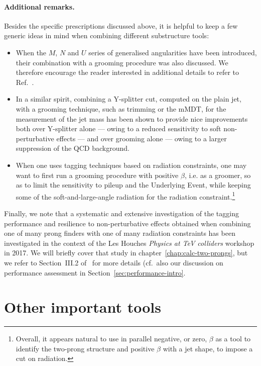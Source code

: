 \paragraph{Additional remarks.} 
%
Besides the specific prescriptions discussed above, it is helpful to
keep a few generic ideas in mind when combining different substructure
tools:
\begin{itemize}
\item When the $M$, $N$ and $U$ series of generalised angularities
  have been introduced, their combination with a grooming procedure
  was also discussed. We therefore encourage the reader interested in
  additional details to refer to Ref.~\cite{Moult:2016cvt}.
\item In a similar spirit, combining a Y-splitter cut, computed on the
  plain jet, with a grooming technique, such as trimming or the mMDT,
  for the measurement of the jet mass has been shown
  \cite{Dasgupta:2015yua,Dasgupta:2016ktv} to provide nice
  improvements both over Y-splitter alone --- owing to a reduced
  sensitivity to soft non-perturbative effects --- and over grooming
  alone --- owing to a larger suppression of the QCD background.
%
\item When one uses tagging techniques based on radiation constraints,
  one may want to first run a \SD grooming procedure with positive
  $\beta$, i.e. as a groomer, so as to limit the sensitivity to pileup
  and the Underlying Event, while keeping some of the
  soft-and-large-angle radiation for the radiation
  constraint.\footnote{Overall, it appears natural to use in parallel
    negative, or zero, $\beta$ as a tool to identify the two-prong
    structure and positive $\beta$ with a jet shape, to impose a cut
    on radiation.}
\end{itemize}

Finally, we note that a systematic and extensive investigation of the
tagging performance and resilience to non-perturbative effects
obtained when combining one of many prong finders with one of many
radiation constraints has been investigated in the context of the Les
Houches {\em Physics at TeV colliders} workshop in 2017. We will
briefly cover that study in chapter~\ref{chap:calc-two-prongs}, but we
refer to Section~III.2 of~\cite{Bendavid:2018nar} for more details
(cf.\ also our discussion on performance assessment in
Section~\ref{sec:performance-intro}.


\section{Other important tools}

